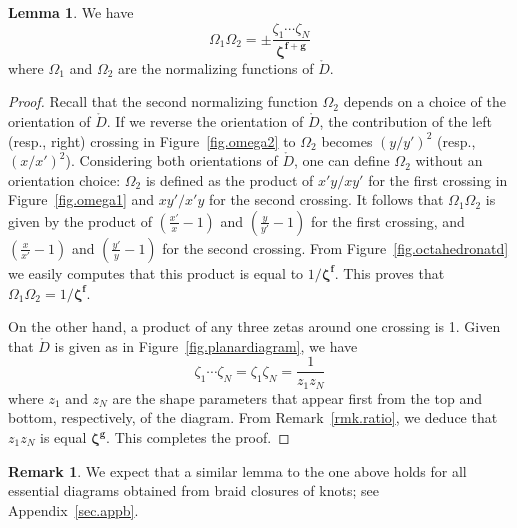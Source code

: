 \documentclass[12pt,reqno]{amsart}
\theoremstyle{definition}
\newtheorem{lemma}[theorem]{Lemma}
\newtheorem{remark}[theorem]{Remark}
\renewcommand{\Ddot}{\mathring{D}}
\begin{document}
\begin{lemma} We have
\label{lem.ccc}
\begin{equation*}
  \Omega_1 \Omega_2 =
  \pm \frac{\zeta_1 \cdots \zeta_N}{{\boldsymbol \zeta}^{\boldsymbol f + \boldsymbol g}}
\end{equation*}
where $\Omega_1$ and $\Omega_2$ are the normalizing functions of $\Ddot$.
\end{lemma}

\begin{proof}
Recall that the second normalizing function $\Omega_2$ depends on a choice of the
orientation of $\Ddot$. If we reverse the orientation of $\Ddot$, the contribution of
the left (resp., right) crossing in Figure~\ref{fig.omega2} to $\Omega_2$ becomes
$(y/y')^2$ (resp., $(x/x')^2$).
Considering both orientations of $\Ddot$, one can define $\Omega_2$ without an
orientation choice: $\Omega_2$ is defined as the product of $x'y/xy'$ for the first
crossing in Figure~\ref{fig.omega1} and $xy'/x'y$ for the second crossing. It follows
that $\Omega_1 \Omega_2$ is given by the product of $(\frac{x'}{x}-1)$ and
$(\frac{y}{y'}-1)$ for the first crossing, and $(\frac{x}{x'}-1)$ and
$(\frac{y'}{y}-1)$ for the second crossing.
From Figure~\ref{fig.octahedronatd} we easily computes that this product is equal
to $1/{\boldsymbol \zeta}^{\boldsymbol f}$. This proves that $\Omega_1 \Omega_2
=1/{\boldsymbol \zeta}^{\boldsymbol f}$.

On the other hand, a product of any three zetas around one crossing is 1. Given that
$\Ddot$ is given as in Figure~\ref{fig.planardiagram}, we have 
\begin{equation*}
\zeta_1 \cdots \zeta_N = \zeta_1 \zeta_N = \frac{1}{z_1 z_N}
\end{equation*}
where $z_1$ and $z_N$ are the shape parameters that appear first from the top and
bottom, respectively, of the diagram. From Remark~\ref{rmk.ratio}, we deduce that
$z_1 z_N$ is equal ${\boldsymbol \zeta}^{\boldsymbol g}$. This completes the proof.
\end{proof}

\begin{remark}
We expect that a similar lemma to the one above holds for all essential diagrams
obtained from braid closures of knots; see Appendix~\ref{sec.appb}.
\end{remark}
\end{document}
